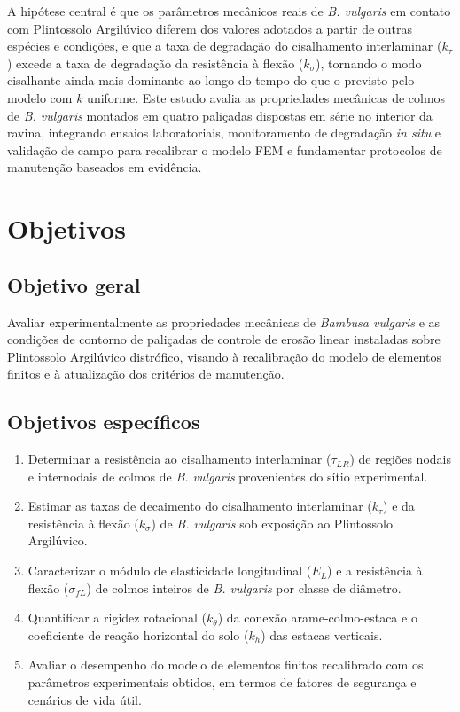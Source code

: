 \documentclass[
  brazilian,
  authoryear,
  preprint]{elsarticle}
\begin{document}
A hipótese central é que os parâmetros mecânicos reais de \emph{B.
vulgaris} em contato com Plintossolo Argilúvico diferem dos valores
adotados a partir de outras espécies e condições, e que a taxa de
degradação do cisalhamento interlaminar (\(k_\tau\)) excede a taxa de
degradação da resistência à flexão (\(k_\sigma\)), tornando o modo
cisalhante ainda mais dominante ao longo do tempo do que o previsto pelo
modelo com \(k\) uniforme. Este estudo avalia as propriedades mecânicas
de colmos de \emph{B. vulgaris} montados em quatro paliçadas dispostas
em série no interior da ravina, integrando ensaios laboratoriais,
monitoramento de degradação \emph{in situ} e validação de campo para
recalibrar o modelo FEM e fundamentar protocolos de manutenção baseados
em evidência.

\section{Objetivos}\label{objetivos}

\subsection{Objetivo geral}\label{objetivo-geral}

Avaliar experimentalmente as propriedades mecânicas de \emph{Bambusa
vulgaris} e as condições de contorno de paliçadas de controle de erosão
linear instaladas sobre Plintossolo Argilúvico distrófico, visando à
recalibração do modelo de elementos finitos e à atualização dos
critérios de manutenção.

\subsection{Objetivos específicos}\label{objetivos-especuxedficos}

\begin{enumerate}
\def\labelenumi{(\alph{enumi})}
\item
  Determinar a resistência ao cisalhamento interlaminar (\(\tau_{LR}\))
  de regiões nodais e internodais de colmos de \emph{B. vulgaris}
  provenientes do sítio experimental.
\item
  Estimar as taxas de decaimento do cisalhamento interlaminar
  (\(k_\tau\)) e da resistência à flexão (\(k_\sigma\)) de \emph{B.
  vulgaris} sob exposição ao Plintossolo Argilúvico.
\item
  Caracterizar o módulo de elasticidade longitudinal (\(E_L\)) e a
  resistência à flexão (\(\sigma_{fL}\)) de colmos inteiros de \emph{B.
  vulgaris} por classe de diâmetro.
\item
  Quantificar a rigidez rotacional (\(k_\theta\)) da conexão
  arame-colmo-estaca e o coeficiente de reação horizontal do solo
  (\(k_h\)) das estacas verticais.
\item
  Avaliar o desempenho do modelo de elementos finitos recalibrado com os
  parâmetros experimentais obtidos, em termos de fatores de segurança e
  cenários de vida útil.
\end{enumerate}
\end{document}
